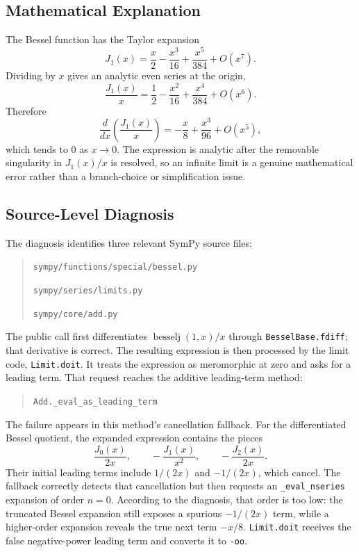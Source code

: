 \documentclass[11pt]{article}
\begin{document}
\subsection{Mathematical Explanation}

The Bessel function has the Taylor expansion
\[
    J_1(x)=\frac{x}{2}-\frac{x^3}{16}+\frac{x^5}{384}+O(x^7).
\]
Dividing by \(x\) gives an analytic even series at the origin,
\[
    \frac{J_1(x)}{x}
    =\frac{1}{2}-\frac{x^2}{16}+\frac{x^4}{384}+O(x^6).
\]
Therefore
\[
    \frac{d}{dx}\left(\frac{J_1(x)}{x}\right)
    =-\frac{x}{8}+\frac{x^3}{96}+O(x^5),
\]
which tends to \(0\) as \(x\to 0\). The expression is analytic after the
removable singularity in \(J_1(x)/x\) is resolved, so an infinite limit is a
genuine mathematical error rather than a branch-choice or simplification issue.

\subsection{Source-Level Diagnosis}

The diagnosis identifies three relevant SymPy source files:
\begin{quote}
\nolinkurl{sympy/functions/special/bessel.py}\par
\nolinkurl{sympy/series/limits.py}\par
\nolinkurl{sympy/core/add.py}
\end{quote}
The public call first differentiates \(\operatorname{besselj}(1,x)/x\) through
\texttt{BesselBase.fdiff}; that derivative is correct. The resulting expression
is then processed by the limit code, \texttt{Limit.doit}. It treats the
expression as meromorphic at zero and asks for a leading term. That request
reaches the additive leading-term method:
\begin{quote}
\texttt{Add.}\texttt{\_eval\_as\_leading\_term}
\end{quote}

The failure appears in this method's cancellation fallback. For the
differentiated Bessel quotient, the expanded expression contains the pieces
\[
    \frac{J_0(x)}{2x}, \qquad -\frac{J_1(x)}{x^2}, \qquad
    -\frac{J_2(x)}{2x}.
\]
Their initial leading terms include \(1/(2x)\) and \(-1/(2x)\), which cancel.
The fallback correctly detects that cancellation but then requests an
\texttt{\_eval\_nseries} expansion of order \(n=0\). According to the
diagnosis, that order is too low: the truncated Bessel expansion still exposes
a spurious \(-1/(2x)\) term, while a higher-order expansion reveals the true
next term \(-x/8\). \texttt{Limit.doit} receives the false negative-power
leading term and converts it to \texttt{-oo}.
\end{document}
